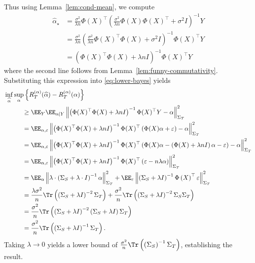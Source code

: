 Thus using Lemma~\ref{lem:cond-mean}, we compute
\begin{align*}
\widehat \alpha_{\star} &=  \frac{\sigma^2}{\lambda n} \Phi(X)^\top \left(\frac{\sigma^2}{\lambda n} \Phi(X) \Phi(X)^\top +  \sigma^2 I\right)^{-1}  Y \\
&= \frac{\sigma^2}{\lambda n} \left( \frac{\sigma^2}{\lambda n}\Phi(X)^\top \Phi(X) +  \sigma^2 I\right)^{-1} \Phi(X)^\top Y \\
&= \left( \Phi(X)^\top \Phi(X) +  \lambda n I\right)^{-1} \Phi(X)^\top Y 
\end{align*}
where the second line follows from Lemma~\ref{lem:funny-commutativity}. Substituting this expression into \eqref{eq:lower-bayes} yields
\begin{align*}
     &\inf_{\widehat \alpha} \mathop{\sup}_{\alpha}\left\{{R}_T^{(\alpha)}(\widehat \alpha) - {R}_T^{(\alpha)}( \alpha) \right\} \\ 
     &\hspace{1cm}\geq \EE_{Y} \EE_{\alpha\mid Y} \left\|  \left( \Phi(X)^\top\Phi(X) +  \lambda n I\right)^{-1} \Phi(X)^\top Y   - \alpha \right\|^2_{\Sigma_{T}} \\
    &\hspace{1cm}= \EE_{\alpha, \varepsilon} \left\|  \left( \Phi(X)^\top\Phi(X) +  \lambda n I\right)^{-1} \Phi(X)^\top\left(  \Phi(X) \alpha + \varepsilon \right) - \alpha \right\|^2_{\Sigma_{T}} \\
        &\hspace{1cm}= \EE_{\alpha, \varepsilon} \left\|  \left( \Phi(X)^\top\Phi(X) +  \lambda n I\right)^{-1} \Phi(X)^\top\left(  \Phi(X) \alpha - \left(\Phi(X) +  \lambda n I\right)\alpha -\varepsilon \right) - \alpha \right\|^2_{\Sigma_{T}} \\
        &\hspace{1cm}= \EE_{\alpha, \varepsilon} \left\|  \left( \Phi(X)^\top\Phi(X) +  \lambda n I\right)^{-1} \Phi(X)^\top\left(\varepsilon - n\lambda \alpha\right)  \right\|^2_{\Sigma_{T}} \\
     & \hspace{1cm}= \EE_{\alpha} \left\|  \lambda\cdot \left(\Sigma_{S} + \lambda\cdot I\right)^{-1} \alpha \right\|^2_{\Sigma_{T}} + \EE_{\varepsilon} \left\|  \left(\Sigma_{S} + \lambda I\right)^{-1} \Phi\left(X\right)^\top \varepsilon  \right\|^2_{\Sigma_{T}} \\
     & \hspace{1cm}= \frac{\lambda \sigma^2}{n} \Tr  \left(\left(\Sigma_{S} + \lambda I\right)^{-2} \Sigma_{T}\right) + \frac{\sigma^2}{n} \Tr\left(\left(\Sigma_S + \lambda I\right)^{-2} \Sigma_S \Sigma_{T}\right) \\
       & \hspace{1cm}= \frac{\sigma^2}{n} \Tr  \left(\left(\Sigma_{S} + \lambda I\right)^{-2} \left(\Sigma_{S}+\lambda I\right)\Sigma_{T}\right) \\
         & \hspace{1cm}=  \frac{\sigma^2}{n} \Tr  \left(\left(\Sigma_S + \lambda I\right)^{-1} \Sigma_{T}\right).
\end{align*}
Taking $\lambda \rightarrow 0$ yields a lower bound of $\frac{\sigma^2}{n} \Tr  \left(\left(\Sigma_S\right)^{-1} \Sigma_{T}\right)$, establishing the result. %

